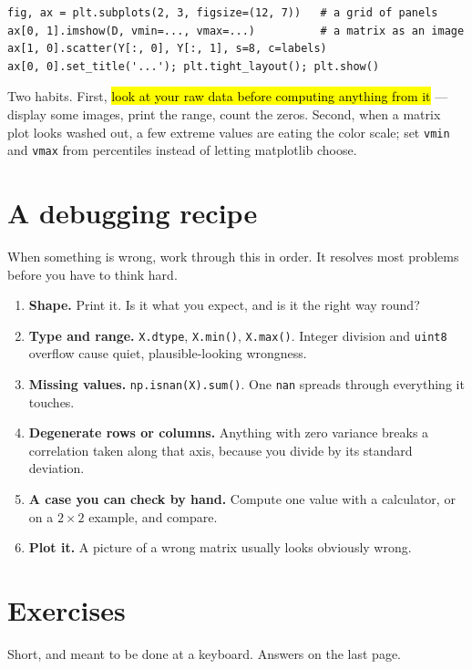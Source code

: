 \documentclass[11pt]{article}
\begin{document}
\begin{lstlisting}
fig, ax = plt.subplots(2, 3, figsize=(12, 7))   # a grid of panels
ax[0, 1].imshow(D, vmin=..., vmax=...)          # a matrix as an image
ax[1, 0].scatter(Y[:, 0], Y[:, 1], s=8, c=labels)
ax[0, 0].set_title('...'); plt.tight_layout(); plt.show()
\end{lstlisting}

Two habits. First, \hl{look at your raw data before computing anything from
it} --- display some images, print the range, count the zeros. Second, when a
matrix plot looks washed out, a few extreme values are eating the color scale;
set \texttt{vmin} and \texttt{vmax} from percentiles instead of letting
matplotlib choose.

\section{A debugging recipe}

When something is wrong, work through this in order. It resolves most problems
before you have to think hard.

\begin{enumerate}
\item \textbf{Shape.} Print it. Is it what you expect, and is it the right way
      round?
\item \textbf{Type and range.} \texttt{X.dtype}, \texttt{X.min()},
      \texttt{X.max()}. Integer division and \texttt{uint8} overflow cause
      quiet, plausible-looking wrongness.
\item \textbf{Missing values.} \texttt{np.isnan(X).sum()}. One \texttt{nan}
      spreads through everything it touches.
\item \textbf{Degenerate rows or columns.} Anything with zero variance breaks
      a correlation taken along that axis, because you divide by its standard
      deviation.
\item \textbf{A case you can check by hand.} Compute one value with a
      calculator, or on a $2\times2$ example, and compare.
\item \textbf{Plot it.} A picture of a wrong matrix usually looks obviously
      wrong.
\end{enumerate}

\section{Exercises}

Short, and meant to be done at a keyboard. Answers on the last page.
\end{document}
